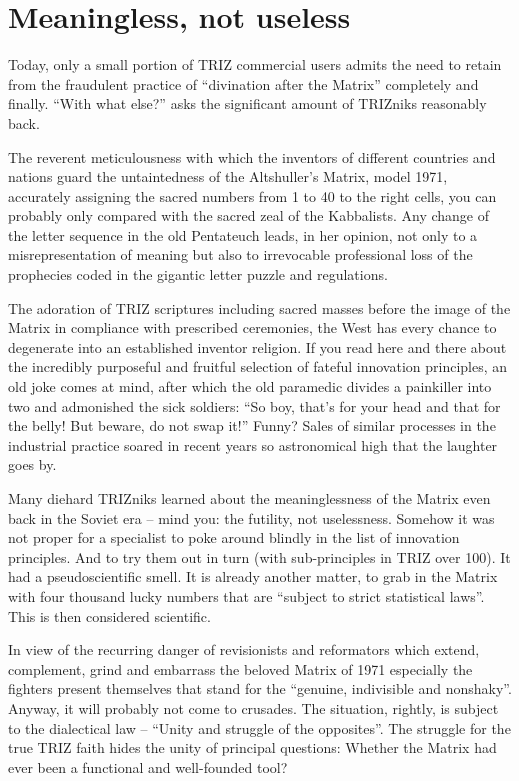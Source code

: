 \documentclass[11pt,a4paper]{article}
\begin{document}
\section*{Meaningless, not useless}
Today, only a small portion of TRIZ commercial users admits the need to retain
from the fraudulent practice of ``divination after the Matrix'' completely and
finally.  ``With what else?'' asks the significant amount of TRIZniks
reasonably back.

The reverent meticulousness with which the inventors of different countries
and nations guard the untaintedness of the Altshuller's Matrix, model 1971,
accurately assigning the sacred numbers from 1 to 40 to the right cells, you
can probably only compared with the sacred zeal of the Kabbalists. Any change
of the letter sequence in the old Pentateuch leads, in her opinion, not only
to a misrepresentation of meaning but also to irrevocable professional loss of
the prophecies coded in the gigantic letter puzzle and regulations.

The adoration of TRIZ scriptures including sacred masses before the image of
the Matrix in compliance with prescribed ceremonies, the West has every chance
to degenerate into an established inventor religion. If you read here and
there about the incredibly purposeful and fruitful selection of fateful
innovation principles, an old joke comes at mind, after which the old
paramedic divides a painkiller into two and admonished the sick soldiers: ``So
boy, that's for your head and that for the belly!  But beware, do not swap
it!'' Funny? Sales of similar processes in the industrial practice soared in
recent years so astronomical high that the laughter goes by.

Many diehard TRIZniks learned about the meaninglessness of the Matrix even
back in the Soviet era -- mind you: the futility, not uselessness. Somehow it
was not proper for a specialist to poke around blindly in the list of
innovation principles. And to try them out in turn (with sub-principles in
TRIZ over 100). It had a pseudoscientific smell. It is already another matter,
to grab in the Matrix with four thousand lucky numbers that are ``subject to
strict statistical laws''. This is then considered scientific.

In view of the recurring danger of revisionists and reformators which extend,
complement, grind and embarrass the beloved Matrix of 1971 especially the
fighters present themselves that stand for the ``genuine, indivisible and
nonshaky''. Anyway, it will probably not come to crusades. The situation,
rightly, is subject to the dialectical law -- ``Unity and struggle of the
opposites''. The struggle for the true TRIZ faith hides the unity of
principal questions: Whether the Matrix had ever been a functional and
well-founded tool?
\end{document}
